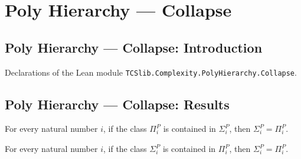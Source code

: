 \section{Poly Hierarchy --- Collapse}
\subsection*{Poly Hierarchy --- Collapse: Introduction}

Declarations of the Lean module \texttt{TCSlib.Complexity.PolyHierarchy.Collapse}.

\subsection*{Poly Hierarchy --- Collapse: Results}

\begin{theorem}
\label{Complexity.SigmaP_eq_PiP_of_PiP_subset_SigmaP}
\leanok
{}
For every natural number $i$, if the class $\Pi_i^P$ is contained in $\Sigma_i^P$, then
$\Sigma_i^P=\Pi_i^P$.
\end{theorem}

\begin{theorem}
\label{Complexity.SigmaP_eq_PiP_of_SigmaP_subset_PiP}
\leanok
{}
For every natural number $i$, if the class $\Sigma_i^P$ is contained in $\Pi_i^P$, then
$\Sigma_i^P=\Pi_i^P$.
\end{theorem}

